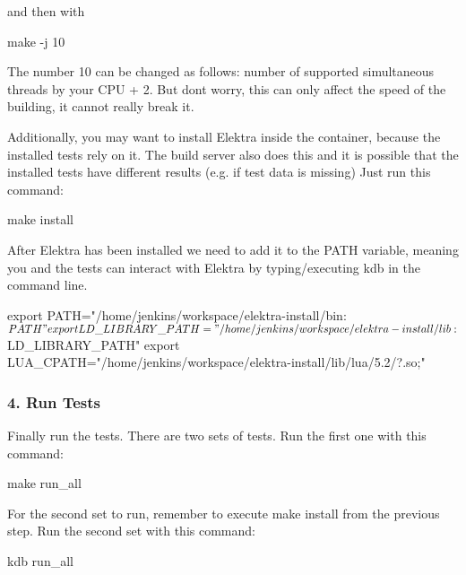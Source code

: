 and then with


\begin{DoxyCode}
make -j 10
\end{DoxyCode}


The number 10 can be changed as follows\+: number of supported simultaneous threads by your C\+PU + 2. But don\textquotesingle{}t worry, this can only affect the speed of the building, it cannot really break it.

Additionally, you may want to install Elektra inside the container, because the installed tests rely on it. The build server also does this and it is possible that the installed tests have different results (e.\+g. if test data is missing) Just run this command\+:


\begin{DoxyCode}
make install
\end{DoxyCode}


After Elektra has been installed we need to add it to the P\+A\+TH variable, meaning you and the tests can interact with Elektra by typing/executing {\ttfamily kdb} in the command line.


\begin{DoxyCode}
export PATH="/home/jenkins/workspace/elektra-install/bin:$PATH"
export LD\_LIBRARY\_PATH="/home/jenkins/workspace/elektra-install/lib:$LD\_LIBRARY\_PATH"
export LUA\_CPATH="/home/jenkins/workspace/elektra-install/lib/lua/5.2/?.so;"
\end{DoxyCode}


\subsubsection*{4. Run Tests}

Finally run the tests. There are two sets of tests. Run the first one with this command\+:


\begin{DoxyCode}
make run\_all
\end{DoxyCode}


For the second set to run, remember to execute {\ttfamily make install} from the previous step. Run the second set with this command\+:


\begin{DoxyCode}
kdb run\_all
\end{DoxyCode}
 